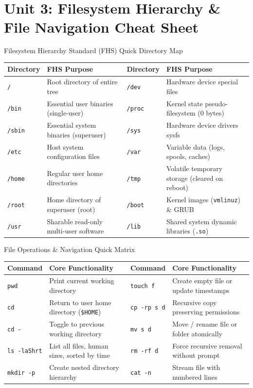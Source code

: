 \chapter{Unit 3: Filesystem Hierarchy \& File Navigation Cheat Sheet}

\begin{cheatbox}{Filesystem Hierarchy Standard (FHS) Quick Directory Map}
\begin{tabularx}{\linewidth}{l X l X}
\toprule
\textbf{Directory} & \textbf{FHS Purpose} & \textbf{Directory} & \textbf{FHS Purpose} \\
\midrule
\texttt{/} & Root directory of entire tree & \texttt{/dev} & Hardware device special files \\
\texttt{/bin} & Essential user binaries (single-user) & \texttt{/proc} & Kernel state pseudo-filesystem (0 bytes) \\
\texttt{/sbin} & Essential system binaries (superuser) & \texttt{/sys} & Hardware device drivers sysfs \\
\texttt{/etc} & Host system configuration files & \texttt{/var} & Variable data (logs, spools, caches) \\
\texttt{/home} & Regular user home directories & \texttt{/tmp} & Volatile temporary storage (cleared on reboot) \\
\texttt{/root} & Home directory of superuser (root) & \texttt{/boot} & Kernel images (\texttt{vmlinuz}) \& GRUB \\
\texttt{/usr} & Sharable read-only multi-user software & \texttt{/lib} & Shared system dynamic libraries (\texttt{.so}) \\
\bottomrule
\end{tabularx}
\end{cheatbox}

\begin{syntaxbox}{File Operations \& Navigation Quick Matrix}
\begin{tabularx}{\linewidth}{l X l X}
\toprule
\textbf{Command} & \textbf{Core Functionality} & \textbf{Command} & \textbf{Core Functionality} \\
\midrule
\texttt{pwd} & Print current working directory & \texttt{touch f} & Create empty file or update timestamps \\
\texttt{cd} & Return to user home directory (\texttt{\$HOME}) & \texttt{cp -rp s d} & Recursive copy preserving permissions \\
\texttt{cd -} & Toggle to previous working directory & \texttt{mv s d} & Move / rename file or folder atomically \\
\texttt{ls -laShrt} & List all files, human sizes, sorted by time & \texttt{rm -rf d} & Force recursive removal without prompt \\
\texttt{mkdir -p} & Create nested directory hierarchy & \texttt{cat -n} & Stream file with numbered lines \\
\bottomrule
\end{tabularx}
\end{syntaxbox}

